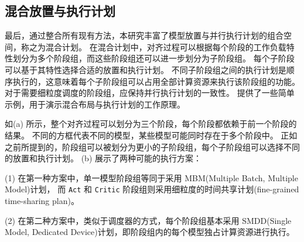 \subsection{混合放置与执行计划}
\label{subsection:intra-stage-hybrid-plan}

最后，通过整合所有现有方法，本研究丰富了模型放置与并行执行计划的组合空间，称之为混合计划。  
在混合计划中，对齐过程可以根据每个阶段的工作负载特性划分为多个阶段组，而这些阶段组还可以进一步划分为子阶段组。  
每个子阶段可以基于其特性选择合适的放置和执行计划。  
不同子阶段组之间的执行计划是顺序执行的，这意味着每个子阶段组可以占用全部计算资源来执行该阶段组的功能。  
对于需要细粒度调度的阶段组，应保持并行执行计划的一致性。  
 提供了一些简单示例，用于演示混合布局与执行计划的工作原理。

如(a) 所示，整个对齐过程可以划分为三个阶段，每个阶段都依赖于前一个阶段的结果。  
不同的方框代表不同的模型，某些模型可能同时存在于多个阶段中。  
正如之前所提到的，阶段组可以被划分为更小的子阶段组，每个子阶段组可以选择不同的放置和执行计划。  
(b) 展示了两种可能的执行方案：

(1) 在第一种方案中，单一模型阶段组等同于采用 MBM(Multiple Batch, Multiple Model)计划，  
而 \texttt{Act} 和 \texttt{Critic} 阶段组则采用细粒度的时间共享计划(fine-grained time-sharing plan)。

(2) 在第二种方案中，类似于调度器的方式，每个阶段组基本采用 SMDD(Single Model, Dedicated Device)计划，即阶段组内的每个模型独占计算资源进行执行。






